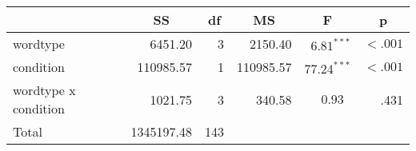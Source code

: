 \begin{center}
\begin{tabular}{lrrrrr}
\toprule
 & \multicolumn{1}{c}{\textbf{SS}} & \multicolumn{1}{c}{\textbf{df}} & \multicolumn{1}{c}{\textbf{MS}} & \multicolumn{1}{c}{\textbf{F}} & \multicolumn{1}{c}{\textbf{p}} \\
\midrule
wordtype & 6451.20 & 3 & 2150.40 & $6.81^{***}$ & $< .001$ \\
condition & 110985.57 & 1 & 110985.57 & $77.24^{***}$ & $< .001$ \\
wordtype x condition & 1021.75 & 3 & 340.58 & $0.93^{   \ \ \ }$ & .431 \\
\midrule
Total & 1345197.48 & 143 \\
\bottomrule
\end{tabular}
\end{center}